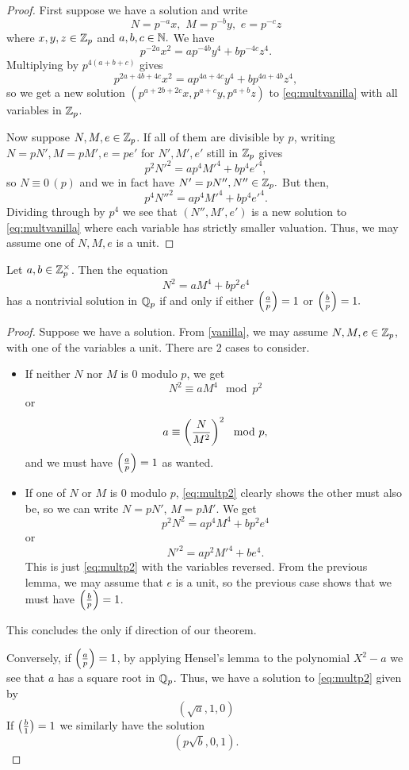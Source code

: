 \documentclass[12pt, a4paper]{report}
\begin{document}
\begin{proof}
  First suppose we have a solution and write
  $$N = p^{-a}x, \,\, M = p^{-b}y, \,\, e = p^{-c}z$$ where $x,y,z \in {\mathbb Z}_p$ and
  $a,b,c \in {\mathbb N}.$ We have
  \[p^{-2a}x^2 = ap^{-4b}y^4 + bp^{-4c}z^4.\]
  Multiplying by $p^{4(a+b+c)}$ gives
  \[p^{2a+4b+4c}x^2 = ap^{4a+4c}y^4 + bp^{4a+4b}z^4,\]
  so we get a new solution $(p^{a+2b+2c}x, p^{a+c}y, p^{a+b}z)$ to
  \autoref{eq:multvanilla} with all variables in ${\mathbb Z}_p$.

  Now suppose $N, M, e \in {\mathbb Z}_p$. If all of them are divisible by $p$,
  writing $N = pN', M = pM', e = pe'$ for $N', M', e'$ still in ${\mathbb Z}_p$ gives
  \[p^2N'^2 = ap^4M'^4 + b p^4e'^4, \]
  so $N \equiv 0 \, (p)$ and we in fact have $N' = pN'', N'' \in {\mathbb Z}_p.$ 
  But then,
  \[p^4N''^2 = ap^4M'^4 + bp^4e'^4.\]
  Dividing through by $p^4$ we see that $(N'',M',e')$ is a new solution to
  \autoref{eq:multvanilla} where each variable has
  strictly smaller valuation. Thus, we may assume one of $N,M,e$ is a unit.
\end{proof}

\begin{lemma} \label{multp2}
  Let $a, b \in {\mathbb Z}_p^\times$. Then the equation
  \begin{equation}
    \label{eq:multp2}
    N^2 = aM^4 + bp^2e^4
  \end{equation}
  has a nontrivial solution in ${\mathbb Q}_p$ if and only if either $\left(\frac{a}{p}\right) = 1$
  or $\left(\frac{b}{p}\right) = 1.$
\end{lemma}
\begin{proof}
  Suppose we have a solution.
  From \autoref{vanilla}, we may assume $N, M, e \in {\mathbb Z}_p$, with one of the
  variables a unit. There are 2 cases to consider.
  \begin{itemize}
  \item If neither $N$ nor $M$ is 0 modulo $p$, we get
    \[N^2 \equiv aM^4 \mod{p^2}\]
    or
    \[a \equiv \left(\frac{N}{M^2}\right)^2 \mod{p},\]
    and we must have $\left(\frac{a}{p}\right) = 1$ as wanted.
  \item If one of $N$ or $M$ is 0 modulo $p$, \autoref{eq:multp2} clearly shows
    the other must also be, so we can write $N = pN'$, $M = pM'$. We get
    \[p^2N^2 = ap^4M^4 + bp^2e^4\]
    or
    \[N'^2 = ap^2M'^4 + be^4.\]
    This is just \autoref{eq:multp2} with the variables reversed. From the
    previous lemma, we may assume that $e$ is a unit, 
    so the previous case shows that we must have
    $\left(\frac{b}{p}\right)=1$.
  \end{itemize}
  This concludes the only if direction of our theorem.

  Conversely, if $\left(\frac{a}{p}\right) = 1$, by applying Hensel's
  lemma to the polynomial $X^2 - a$ we see that $a$ has a square root in
  ${\mathbb Q}_p$. Thus, we have a solution
  to \autoref{eq:multp2} given by
  \[(\sqrt{a}, 1, 0)\]
  If $\left(\frac{b}{1}\right) = 1$ we similarly have the solution
  \[(p\sqrt{b}, 0, 1).\]
  
\end{proof}
\end{document}
